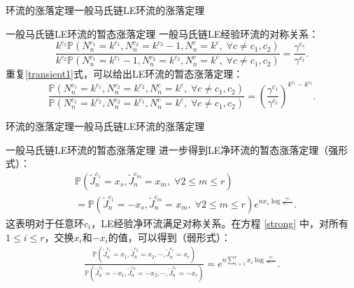 \documentclass{beamer}
\newcommand{\Pnum}{\mathbb{P}}
\begin{document}
\begin{frame}{环流的涨落定理}{一般马氏链LE环流的涨落定理}
	\begin{block}{一般马氏链LE环流的暂态涨落定理}
		一般马氏链LE经验环流的对称关系：
		\begin{equation} \label{transient1}
			\frac{k^{c_1} \Pnum(N^{c_1}_n=k^{c_1},N^{c_2}_n=k^{c_2}-1,N^{c}_n=k^{c},\;\forall c\neq c_1,c_2)}
			{k^{c_2} \Pnum(N^{c_1}_n=k^{c_1} -1,N^{c_2}_n=k^{c_2},N^{c}_n=k^{c},\;\forall c\neq c_1,c_2)}
			= \frac{\gamma^{c_s}}{\gamma^{c_t}}.
		\end{equation}
		重复\ref{transient1}式，可以给出LE环流的暂态涨落定理：
		\begin{equation} \label{transient2}
			\frac{\Pnum(N^{c_1}_n=k^{c_1},N^{c_2}_n=k^{c_2},N^{c}_n=k^{c},\;\forall c\neq c_1,c_2)}
			{\Pnum(N^{c_1}_n=k^{c_2},N^{c_2}_n=k^{c_1},N^{c}_n=k^{c},\;\forall c\neq c_1,c_2)}
			= \left(\frac{\gamma^{c_1}}{\gamma^{c_t}}\right)^{k^{c_1}-k^{c_2}}.
		\end{equation}
		
	\end{block}
\end{frame}

\begin{frame}{环流的涨落定理}{一般马氏链LE环流的涨落定理}
	\begin{block}{一般马氏链LE环流的暂态涨落定理}
		进一步得到LE净环流的暂态涨落定理（强形式）：
		\begin{align*} \label{strong}
			&\Pnum(\tilde{J}^{c_1}_n=x_s,\tilde{J}^{c_m}_n=x_m,\;\forall 2\le m \le r)\\
			&= \Pnum(\tilde{J}^{c_1}_n=-x_s,\tilde{J}^{c_m}_n=x_m,\;\forall 2\le m \le r)e^{nx_s\log\frac{\gamma^{c_1}}{\gamma^{c_1-}}}.
		\end{align*}
		这表明对于任意环$c_i$，LE经验净环流满足对称关系。在方程 \ref{strong} 中，对所有$1\le i \le r$，交换$x_i$和$-x_i$的值，可以得到（弱形式）：
		\begin{equation}\label{weak1}
			\begin{split}
			\frac{\Pnum\left(\tilde{J}^{c_1}_n=x_1,\tilde{J}^{c_2}_n=x_2,\cdots,\tilde{J}^{c_{r}}_n=x_{r}\right)}
			{\Pnum\left(\tilde{J}^{c_1}_n=-x_1,\tilde{J}^{c_2}_n=-x_2,\cdots,\tilde{J}^{c_{r}}_n=-x_{r}\right)}
			=e^{n\sum_{i=1}^{r}x_i\log\frac{\gamma^{c_i}}{\gamma^{c_i-}}}.
			\end{split}
		\end{equation}
	\end{block}
\end{frame}
\end{document}
